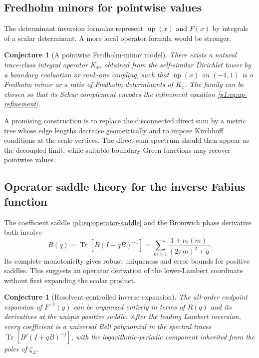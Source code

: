 \documentclass[11pt,oneside]{article}
\newtheorem{conjecture}[theorem]{Conjecture}
\theoremstyle{definition}
\newcommand{\Up}{\operatorname{up}}
\newcommand{\Tr}{\operatorname{Tr}}
\newcommand{\vtwo}{\nu_2}
\begin{document}
\subsection{Fredholm minors for pointwise values}

The determinant inversion formulas represent \(\Up(x)\) and \(F(x)\) by integrals of
a scalar determinant.  A more local operator formula would be stronger.

\begin{conjecture}[A pointwise Fredholm-minor model]
\label{p1:conj:minor}
There exists a natural trace-class integral operator \(K_x\), obtained from the
self-similar Dirichlet tower by a boundary evaluation or rank-one coupling, such that
\(\Up(x)\) on \((-1,1)\) is a Fredholm minor or a ratio of Fredholm determinants of
\(K_x\).  The family can be chosen so that its Schur complement encodes the refinement
equation \eqref{p1:eq:up-refinement}.
\end{conjecture}

A promising construction is to replace the disconnected direct sum by a metric tree
whose edge lengths decrease geometrically and to impose Kirchhoff conditions at the
scale vertices.  The direct-sum spectrum should then appear as the decoupled limit,
while suitable boundary Green functions may recover pointwise values.

\subsection{Operator saddle theory for the inverse Fabius function}

The coefficient saddle \eqref{p1:eq:operator-saddle} and the Bromwich phase derivative
both involve
\begin{equation}
 R(q)=\Tr[B(I+qB)^{-1}]
 =\sum_{m\ge1}\frac{1+\vtwo(m)}{(2\pi m)^2+q}.
 \label{p1:eq:Rq}
\end{equation}
Its complete monotonicity gives robust uniqueness and error bounds for positive
saddles.  This suggests an operator derivation of the lower-Lambert coordinate without
first expanding the scalar product.

\begin{conjecture}[Resolvent-controlled inverse expansion]
\label{p1:conj:inverse-resolvent}
The all-order endpoint expansion of \(F^{-1}(y)\) can be organized entirely in terms
of \(R(q)\) and its derivatives at the unique positive saddle.  After the leading
Lambert inversion, every coefficient is a universal Bell polynomial in the spectral
traces \(\Tr[B^j(I+qB)^{-j}]\), with the logarithmic-periodic component inherited from
the poles of \(\zeta_{\mathscr L}\).
\end{conjecture}
\end{document}
